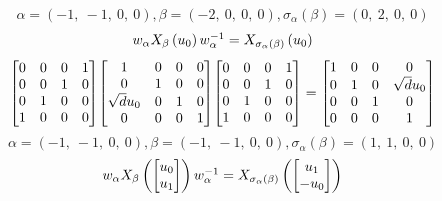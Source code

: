 \documentclass[11pt]{article}
\theoremstyle{definition}
\begin{document}
\[
\alpha = \left( -1, \  -1, \  0, \  0\right), \beta = \left( -2, \  0, \  0, \  0\right), \sigma_{\alpha}(\beta) = \left( 0, \  2, \  0, \  0\right)
\]
\[
\scaletoalign{\textwidth}{w_{\alpha} X_{\beta}\left(u_{0}\right) w_{\alpha}^{-1} = X_{\sigma_{\alpha}\left(\beta\right)}\left(u_{0}\right)}
\]
\[
\scaletoalign{\textwidth}{{\left[\begin{matrix}0 & 0 & 0 & 1\\0 & 0 & 1 & 0\\0 & 1 & 0 & 0\\1 & 0 & 0 & 0\end{matrix}\right]} {\left[\begin{matrix}1 & 0 & 0 & 0\\0 & 1 & 0 & 0\\\sqrt{d} u_{0} & 0 & 1 & 0\\0 & 0 & 0 & 1\end{matrix}\right]} {\left[\begin{matrix}0 & 0 & 0 & 1\\0 & 0 & 1 & 0\\0 & 1 & 0 & 0\\1 & 0 & 0 & 0\end{matrix}\right]} = {\left[\begin{matrix}1 & 0 & 0 & 0\\0 & 1 & 0 & \sqrt{d} u_{0}\\0 & 0 & 1 & 0\\0 & 0 & 0 & 1\end{matrix}\right]}}
\]
\[
\alpha = \left( -1, \  -1, \  0, \  0\right), \beta = \left( -1, \  -1, \  0, \  0\right), \sigma_{\alpha}(\beta) = \left( 1, \  1, \  0, \  0\right)
\]
\[
\scaletoalign{\textwidth}{w_{\alpha} X_{\beta}\left(\left[\begin{matrix}u_{0}\\u_{1}\end{matrix}\right]\right) w_{\alpha}^{-1} = X_{\sigma_{\alpha}\left(\beta\right)}\left(\left[\begin{matrix}u_{1}\\- u_{0}\end{matrix}\right]\right)}
\]
\end{document}
